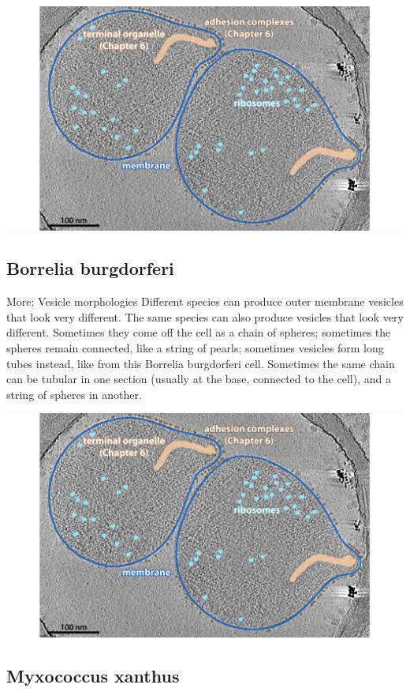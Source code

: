 \documentclass[]{tufte-book}
\begin{document}
\includegraphics{img/02_static/2_1_Mgenitalium}

\subsection{Borrelia burgdorferi}\label{borrelia-burgdorferi-1}

More: Vesicle morphologies Different species can produce outer membrane
vesicles that look very different. The same species can also produce
vesicles that look very different. Sometimes they come off the cell as a
chain of spheres; sometimes the spheres remain connected, like a string
of pearls; sometimes vesicles form long tubes instead, like from this
Borrelia burgdorferi cell. Sometimes the same chain can be tubular in
one section (usually at the base, connected to the cell), and a string
of spheres in another.

\includegraphics{img/02_static/2_1_Mgenitalium}

\subsection{Myxococcus xanthus}\label{myxococcus-xanthus}
\end{document}
